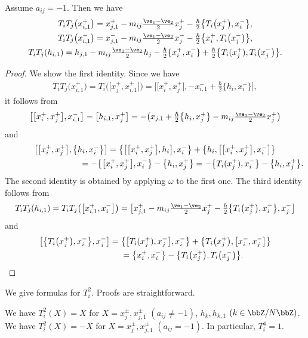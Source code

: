 \begin{prop}\label{prop:iji}Assume $a_{ij}=-1$. Then we have
\begin{gather*}
T_i T_j \big(x_{i,1}^+\big) = x_{j,1}^+ - m_{ij}\tfrac{\ve_1 - \ve_2}{2}x_j^+ - \tfrac{\hbar}{2}\big\{T_i\big(x_j^+\big),x_i^-\big\}, \\
T_i T_j \big(x_{i,1}^-\big) = x_{j,1}^- - m_{ij}\tfrac{\ve_1 - \ve_2}{2}x_j^- - \tfrac{\hbar}{2}\big\{x_i^+,T_i\big(x_j^-\big)\big\}, \\
T_i T_j (h_{i,1}) = h_{j,1} - m_{ij}\tfrac{\ve_1 - \ve_2}{2}h_j - \tfrac{\hbar}{2}\{x_i^+,x_i^-\} + \tfrac{\hbar}{2}\big\{T_i(x_j^+),T_i\big(x_j^-\big)\big\}.
\end{gather*}
\end{prop}
\begin{proof}We show the first identity. Since we have
\begin{gather*}
T_iT_j\big(x_{i,1}^+\big) = T_i\big(\big[x_{j}^+,x_{i,1}^+\big]\big) = \big[\big[x_i^+,x_j^+\big],-x_{i,1}^-+\tfrac{\hbar}{2}\big\{h_i,x_i^{-}\big\}\big],
\end{gather*}
it follows from
\begin{gather*}
\big[\big[x_i^+,x_j^+\big],x_{i,1}^-\big] = \big[h_{i,1},x_j^+\big] = -\big( x_{j,1} + \tfrac{\hbar}{2}\big\{h_i,x_j^{+}\big\} - m_{ij} \tfrac{\ve_1 - \ve_2}{2}x_j^+ \big)
\end{gather*}
and
\begin{gather*}
\big[\big[x_i^+,x_j^+\big],\big\{h_i,x_i^{-}\big\}\big]= \big\{\big[\big[x_i^+,x_j^+\big],h_i\big],x_i^-\big\} + \big\{h_i,\big[\big[x_i^+,x_j^+\big],x_i^-\big]\big\} \\
 \hphantom{\big[\big[x_i^+,x_j^+\big],\big\{h_i,x_i^{-}\big\}\big]}{} = -\big\{\big[x_i^+,x_j^+\big],x_i^-\big\} - \big\{h_i,x_j^{+}\big\} = -\big\{T_i(x_j^+),x_i^-\big\} - \big\{h_i,x_j^{+}\big\}.
\end{gather*}
The second identity is obtained by applying $\omega$ to the first one. The third identity follows from
\begin{gather*}
T_iT_j(h_{i,1})= T_iT_j\big(\big[x_{i,1}^+,x_{i}^-\big]\big) = \big[x_{j,1}^+-m_{ij}\tfrac{\ve_1-\ve_2}{2}x_j^+-\tfrac{\hbar}{2}\big\{T_i\big(x_j^+\big),x_i^-\big\},x_j^-\big]
\end{gather*}
and
\begin{gather*}
\big[\big\{T_i\big(x_j^+\big),x_i^-\big\},x_j^-\big] = \big\{\big[T_i(x_j^+),x_j^-\big],x_i^-\big\} + \big\{T_i\big(x_j^+\big),\big[x_i^-,x_j^-\big]\big\}\\
\hphantom{\big[\big\{T_i\big(x_j^+\big),x_i^-\big\},x_j^-\big]}{} = \big\{x_i^+,x_i^-\big\} - \big\{T_i\big(x_j^+\big),T_i\big(x_j^-\big)\big\}.\tag*{\qed}
\end{gather*}\renewcommand{\qed}{}
\end{proof}

We give formulas for $T_i^2$. Proofs are straightforward.
\begin{prop} We have $T_i^2(X)=X$ for $X=x_{j}^{\pm}, x_{j,1}^{\pm}$ $(a_{ij} \neq -1)$, $h_k, h_{k,1}$ $(k \in \bbZ/N\bbZ)$. We have $T_i^2(X)=-X$ for $X=x_{j}^{\pm}, x_{j,1}^{\pm}$ $(a_{ij} = -1)$. In particular, $T_i^4 = 1$.
\end{prop}

